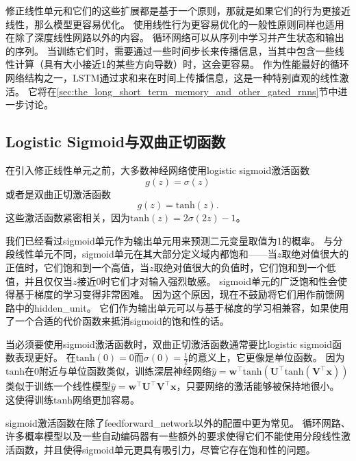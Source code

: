 修正线性单元和它们的这些扩展都是基于一个原则，那就是如果它们的行为更接近线性，那么模型更容易优化。
使用线性行为更容易优化的一般性原则同样也适用在除了深度线性网路以外的内容。
循环网络可以从序列中学习并产生状态和输出的序列。
当训练它们时，需要通过一些时间步长来传播信息，当其中包含一些线性计算（具有大小接近1的某些方向导数）时，这会更容易。
作为性能最好的循环网络结构之一，LSTM通过求和来在时间上传播信息，这是一种特别直观的线性激活。
它将在\ref{sec:the_long_short_term_memory_and_other_gated_rnns}节中进一步讨论。


\subsection{Logistic Sigmoid与双曲正切函数}
\label{sec:logistic_sigmoid_and_hyperbolic_tangent}

在引入修正线性单元之前，大多数神经网络使用logistic sigmoid激活函数
\begin{equation}
g(z) = \sigma(z)
\end{equation}
或者是双曲正切激活函数
\begin{equation}
g(z) = \text{tanh}(z).
\end{equation}
这些激活函数紧密相关，因为$\text{tanh}(z)=2\sigma(2z)-1$。

我们已经看过sigmoid单元作为输出单元用来预测二元变量取值为1的概率。
与分段线性单元不同，sigmoid单元在其大部分定义域内都饱和——当$z$取绝对值很大的正值时，它们饱和到一个高值，当$z$取绝对值很大的负值时，它们饱和到一个低值，并且仅仅当$z$接近0时它们才对输入强烈敏感。
sigmoid单元的广泛饱和性会使得基于梯度的学习变得非常困难。
因为这个原因，现在不鼓励将它们用作前馈网路中的\gls{hidden_unit}。
它们作为输出单元可以与基于梯度的学习相兼容，如果使用了一个合适的代价函数来抵消sigmoid的饱和性的话。

当必须要使用sigmoid激活函数时，双曲正切激活函数通常要比logistic sigmoid函数表现更好。
在$\text{tanh}(0)=0$而$\sigma(0)=\frac{1}{2}$的意义上，它更像是单位函数。
因为$\text{tanh}$在0附近与单位函数类似，训练深层神经网络$\hat{y}=\bm{w}^\top \text{tanh}(\bm{U}^\top \text{tanh}(\bm{V}^\top \bm{x}))$类似于训练一个线性模型$\hat{y}= \bm{w}^\top \bm{U}^\top \bm{V}^\top \bm{x}$，只要网络的激活能够被保持地很小。
这使得训练$\text{tanh}$网络更加容易。


sigmoid激活函数在除了\gls{feedforward_network}以外的配置中更为常见。
循环网路、许多概率模型以及一些自动编码器有一些额外的要求使得它们不能使用分段线性激活函数，并且使得sigmoid单元更具有吸引力，尽管它存在饱和性的问题。

